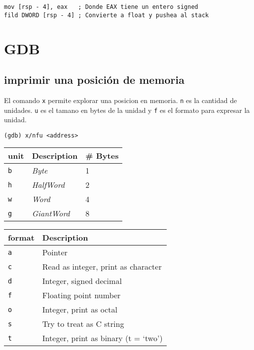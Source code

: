\documentclass{article}
\begin{document}
\begin{verbatim}
mov [rsp - 4], eax   ; Donde EAX tiene un entero signed
fild DWORD [rsp - 4] ; Convierte a float y pushea al stack
\end{verbatim}


\section{GDB}

\subsection{imprimir una posici\'on de memoria}

El comando \texttt{x} permite explorar una posicion en memoria. \texttt{n} es
la cantidad de unidades. \texttt{u} es el tamano en bytes de la unidad y
\texttt{f} es el formato para expresar la unidad.

\begin{verbatim}
(gdb) x/nfu <address>
\end{verbatim}

\begin{tabular}{l l l}
    \toprule
    \textbf{unit} & \textbf{Description} & \textbf{\# Bytes} \\
    \midrule
    \texttt{b} & \textit{Byte}     & 1\\
    \texttt{h} & \textit{HalfWord} & 2\\
    \texttt{w} & \textit{Word}     & 4\\
    \texttt{g} & \textit{GiantWord}& 8\\
    \bottomrule
\end{tabular}

\begin{tabular}{l l}
    \toprule
    \textbf{format} & \textbf{Description} \\
    \midrule
    \texttt{a} & Pointer \\
    \texttt{c} & Read as integer, print as character \\
    \texttt{d} & Integer, signed decimal \\
    \texttt{f} & Floating point number \\
    \texttt{o} & Integer, print as octal \\
    \texttt{s} & Try to treat as C string \\
    \texttt{t} & Integer, print as binary (t = `two') \\
    \bottomrule
\end{tabular}
\end{document}
